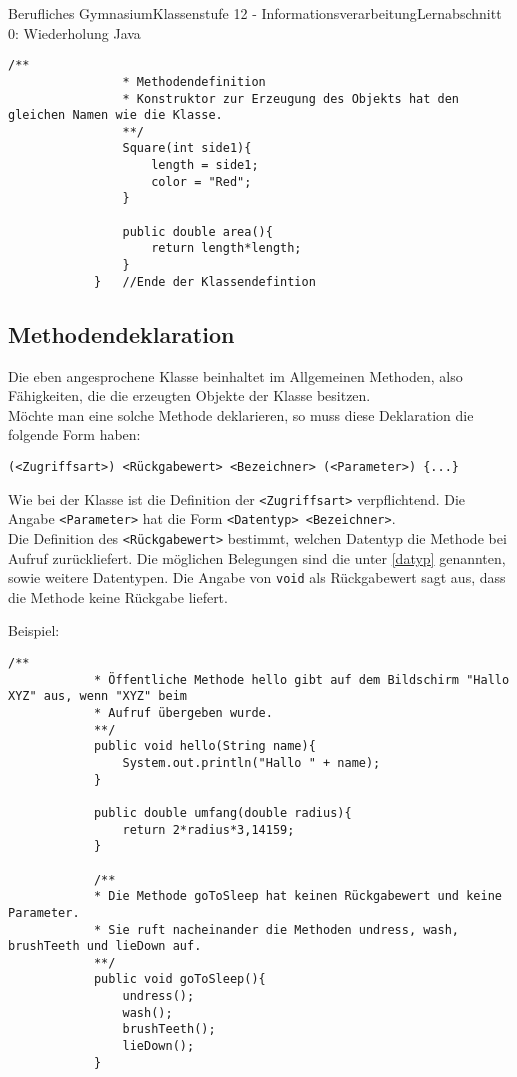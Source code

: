 \documentclass[11pt,oneside,openany,headings=optiontotoc,11pt,numbers=noenddot]{article}
\begin{document}
\begin{worksheet}{Berufliches Gymnasium}{Klassenstufe 12 - Informationsverarbeitung}{Lernabschnitt 0: Wiederholung Java}
\begin{lstlisting}[style=JavaInputStyle,frame=single]
				/**
				* Methodendefinition
				* Konstruktor zur Erzeugung des Objekts hat den gleichen Namen wie die Klasse.
				**/
				Square(int side1){
					length = side1;
					color = "Red";
				}
				
				public double area(){
					return length*length;
				}
			}	//Ende der Klassendefintion
		\end{lstlisting}
		\subsection{Methodendeklaration}
		Die eben angesprochene Klasse beinhaltet im Allgemeinen Methoden, also \glqq{}Fähigkeiten\grqq{}, die die erzeugten Objekte der Klasse besitzen.\\
		Möchte man eine solche Methode deklarieren, so muss diese Deklaration die folgende Form haben:
		\begin{lstlisting}[style=JavaInputStyle]
			(<Zugriffsart>) <Rückgabewert> <Bezeichner> (<Parameter>) {...}
		\end{lstlisting}
		Wie bei der Klasse ist die Definition der \lstinline[style=JavaInputStyle]{<Zugriffsart>} verpflichtend. Die Angabe \lstinline[style=JavaInputStyle]{<Parameter>} hat die Form \lstinline[style=JavaInputStyle]{<Datentyp> <Bezeichner>}.\\
		Die Definition des \lstinline[style=JavaInputStyle]{<Rückgabewert>} bestimmt, welchen Datentyp die Methode bei Aufruf zurückliefert. Die möglichen Belegungen sind die unter \ref{datyp} genannten, sowie weitere Datentypen. Die Angabe von \lstinline[style=JavaInputStyle]{void} als Rückgabewert sagt aus, dass die Methode keine Rückgabe liefert.\\
		\par\noindent
		Beispiel:
		\begin{lstlisting}[style=JavaInputStyle,frame=single]
			/**
			* Öffentliche Methode hello gibt auf dem Bildschirm "Hallo XYZ" aus, wenn "XYZ" beim
			* Aufruf übergeben wurde.
			**/
			public void hello(String name){
				System.out.println("Hallo " + name);
			}
			
			public double umfang(double radius){
				return 2*radius*3,14159;
			}
			
			/**
			* Die Methode goToSleep hat keinen Rückgabewert und keine Parameter.
			* Sie ruft nacheinander die Methoden undress, wash, brushTeeth und lieDown auf.
			**/
			public void goToSleep(){
				undress();
				wash();
				brushTeeth();
				lieDown();
			}
		\end{lstlisting}

\end{worksheet}
\end{document}

